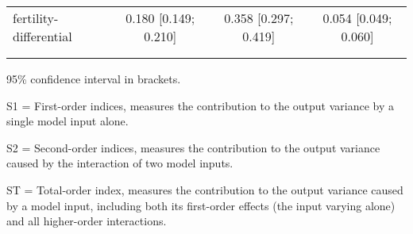 \begin{table}[htp]
\begin{threeparttable}
\begin{tabular}{lccc}
	  \hspace{1.5em} fertility-differential & 0.180 [0.149; 0.210]   & 0.358 [0.297; 0.419]   & 0.054 [0.049; 0.060] \\
	 \\
    \addlinespace
    \hline
    \end{tabular}
    \begin{tablenotes}
    \scriptsize
    \item 95\% confidence interval in brackets.
    \item S1 = First-order indices,  measures the contribution to the output variance by a single model input alone.
    \item S2 = Second-order indices,  measures the contribution to the output variance caused by the interaction of two model inputs.
    \item ST = Total-order index, measures the contribution to the output variance caused by a model input, including both its first-order effects (the input varying alone) and all higher-order interactions.
    \end{tablenotes}
    \end{threeparttable}
    \end{table}